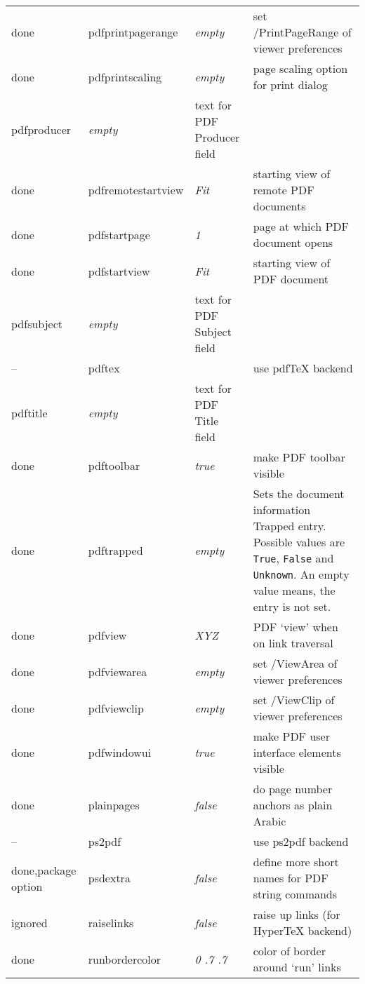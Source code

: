 \begin{longtable}{@{}l>{\ttfamily}llp{7cm}@{}}
done & pdfprintpagerange  & \textit{empty}         & set /PrintPageRange of viewer preferences \\
done & pdfprintscaling    & \textit{empty}         & page scaling option for print dialog \\
pdfproducer        & \textit{empty}         & text for PDF Producer field \\
done & pdfremotestartview & \textit{Fit}           & starting view of remote PDF documents \\
done & pdfstartpage       & \textit{1}             & page at which PDF document opens \\
done & pdfstartview       & \textit{Fit}           & starting view of PDF document \\
pdfsubject         & \textit{empty}         & text for PDF Subject field \\
-- & pdftex             &                        & use \textsf{pdf\TeX} backend \\
pdftitle           & \textit{empty}         & text for PDF Title field \\
done &pdftoolbar         & \textit{true}          & make PDF toolbar visible \\
done & pdftrapped         & \textit{empty} & Sets the document information Trapped entry.
  Possible values are \texttt{True}, \texttt{False} and \texttt{Unknown}.
  An empty value means, the entry is not set.\\
done & pdfview            & \textit{XYZ}           & PDF `view' when on link traversal \\
done & pdfviewarea        & \textit{empty}         & set /ViewArea of viewer preferences \\
done & pdfviewclip        & \textit{empty}         & set /ViewClip of viewer preferences \\
done & pdfwindowui        & \textit{true}          & make PDF user interface elements visible \\
done & plainpages         & \textit{false}         & do page number anchors as plain Arabic \\
-- & ps2pdf             &                        & use \textsf{ps2pdf} backend \\
done,package option& psdextra           & \textit{false}         & define more short names for PDF string commands \\
ignored & raiselinks         & \textit{false}         & raise up links (for \textsf{Hyper\TeX} backend) \\
done & runbordercolor     & \textit{0 .7 .7}       & color of border around `run' links \\

\end{longtable}
